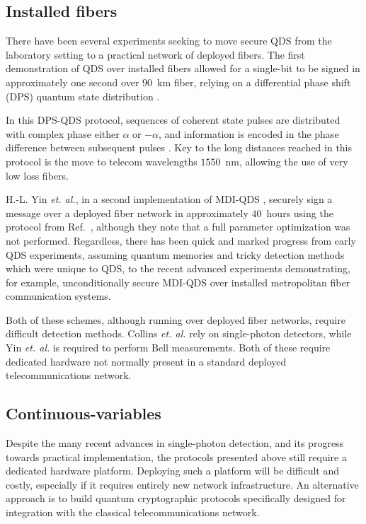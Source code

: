 \subsection{Installed fibers}
There have been several experiments seeking to move secure QDS from the laboratory setting to a practical network of deployed fibers. The first demonstration of QDS over installed fibers \cite{Collins2016} allowed for a single-bit to be signed in approximately one second over $90$~km fiber, relying on a differential phase shift (DPS) quantum state distribution \cite{Inoue2002}.

In this DPS-QDS protocol, sequences of coherent state pulses are distributed with complex phase either $\alpha$ or $- \alpha$, and information is encoded in the phase difference between subsequent pulses \cite{Inoue2015}. Key to the long distances reached in this protocol is the move to telecom wavelengths $1550$~nm, allowing the use of very low loss fibers. 


H.-L. Yin \emph{et. al.}, in a second implementation of MDI-QDS \cite{Yin2017}, securely sign a message over a deployed fiber network in approximately $40$~hours using the protocol from Ref.~\cite{Puthoor2016}, although they note that a full parameter optimization was not performed. Regardless, there has been quick and marked progress from early QDS experiments, assuming quantum memories and tricky detection methods which were unique to QDS, to the recent advanced experiments demonstrating, for example, unconditionally secure MDI-QDS over installed metropolitan fiber communication systems.

Both of these schemes, although running over deployed fiber networks, require difficult detection methods. Collins \emph{et. al.} \cite{Collins2016} rely on single-photon detectors, while Yin \emph{et. al.} \cite{Yin2017} is required to perform Bell measurements. Both of these require dedicated hardware not normally present in a standard deployed telecommunications network.


\subsection{Continuous-variables}


Despite the many recent advances in single-photon detection, and its progress towards practical implementation, the protocols presented above still require a dedicated hardware platform. Deploying such a platform will be difficult and costly, especially if it requires entirely new network infrastructure. An alternative approach is to build quantum cryptographic protocols specifically designed for integration with the classical telecommunications network. 


